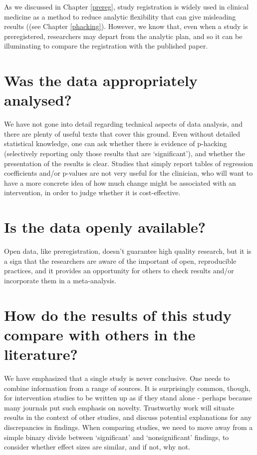 \documentclass{krantz}
\begin{document}
As we discussed in Chapter \ref{prereg}, study registration is widely used in clinical medicine as a method to reduce analytic flexibility that can give misleading results ((see Chapter \ref{phacking}). However, we know that, even when a study is preregistered, researchers may depart from the analytic plan, and so it can be illuminating to compare the registration with the published paper.

\hypertarget{was-the-data-appropriately-analysed}{%
\section{Was the data appropriately analysed?}\label{was-the-data-appropriately-analysed}}

We have not gone into detail regarding technical aspects of data analysis, and there are plenty of useful texts that cover this ground. Even without detailed statistical knowledge, one can ask whether there is evidence of p-hacking (selectively reporting only those results that are `significant'), and whether the presentation of the results is clear. Studies that simply report tables of regression coefficients and/or p-values are not very useful for the clinician, who will want to have a more concrete idea of how much change might be associated with an intervention, in order to judge whether it is cost-effective.

\hypertarget{is-the-data-openly-available}{%
\section{Is the data openly available?}\label{is-the-data-openly-available}}

Open data, like preregistration, doesn't guarantee high quality research, but it is a sign that the researchers are aware of the important of open, reproducible practices, and it provides an opportunity for others to check results and/or incorporate them in a meta-analysis.

\hypertarget{how-do-the-results-of-this-study-compare-with-others-in-the-literature}{%
\section{How do the results of this study compare with others in the literature?}\label{how-do-the-results-of-this-study-compare-with-others-in-the-literature}}

We have emphasized that a single study is never conclusive. One needs to combine information from a range of sources. It is surprisingly common, though, for intervention studies to be written up as if they stand alone - perhaps because many journals put such emphasis on novelty. Trustworthy work will situate results in the context of other studies, and discuss potential explanations for any discrepancies in findings. When comparing studies, we need to move away from a simple binary divide between `significant' and `nonsignificant' findings, to consider whether effect sizes are similar, and if not, why not.
\end{document}
